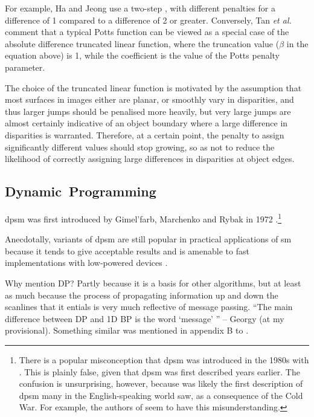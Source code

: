 For example, Ha and Jeong \cite{Ha2016} use a two-step , with different penalties for a difference of 1 compared to a difference of 2 or greater. Conversely, Tan \textit{et al.} \cite{Tan2017} comment that a typical Potts function can be viewed as a special case of the absolute difference truncated linear function, where the truncation value (\(\beta\) in the equation above) is 1, while the coefficient is the value of the Potts penalty parameter.

The choice of the truncated linear function is motivated by the assumption that most surfaces in images either are planar, or smoothly vary in disparities, and thus larger jumps should be penalised more heavily, but very large jumps are almost certainly indicative of an object boundary where a large difference in disparities is warranted.  Therefore, at a certain point, the penalty to assign significantly different values should stop growing, so as not to reduce the likelihood of correctly assigning large differences in disparities at object edges.

\subsection{Dynamic~Programming}

\gls{dpsm} was first introduced by Gimel'farb, Marchenko and Rybak in 1972 \cite{Gimelfarb1972}.\footnote{There is a popular misconception that \gls{dpsm} was introduced in the 1980s with \cite{Ohta1985}.  This is plainly false, given that \gls{dpsm} was first described years earlier.  The confusion is unsurprising, however, because \cite{Ohta1985} was likely the first description of \gls{dpsm} many in the English-speaking world saw, as a consequence of the Cold War.  For example, the authors \cite{Salmen2009} of seem to have this misunderstanding.}  

Anecdotally, variants of \gls{dpsm} are still popular in practical applications of \gls{sm} because it tends to give acceptable results \fxerror[inline]{[ref?]} and is amenable to fast implementations with low-powered devices \fxerror[inline]{[ref?]}.

\begin{anfxnote}{Why mention DP?}
    Partly because it is a basis for other algorithms, but at least as much because the process of propagating information up and down the scanlines that it entials is very much reflective of message passing.  ``The main difference between DP and 1D BP is the word `message' '' -- Georgy (at my provisional).  Something similar was mentioned in appendix B to \cite{Szeliski2011}.
\end{anfxnote}

